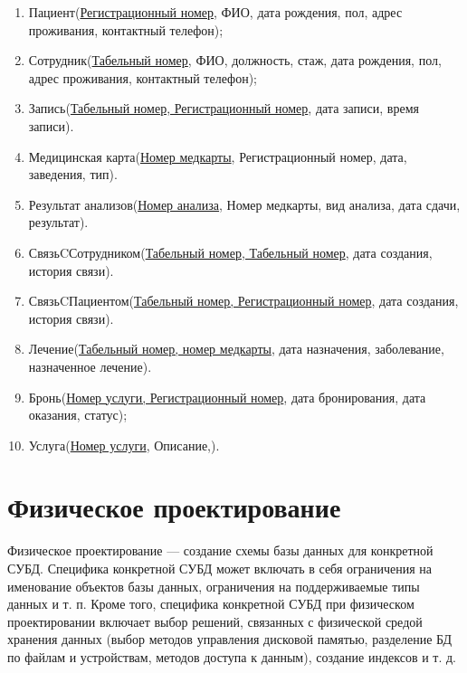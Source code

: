 \documentclass[14pt,a4paper,russian]{extreport}
\begin{document}
\begin{enumerate}
            \item Пациент(\underline{Регистрационный номер}, ФИО, дата рождения, пол, адрес
                проживания, контактный телефон);
            \item Сотрудник(\underline{Табельный номер}, ФИО, должность, стаж, дата рождения, пол, адрес
                проживания, контактный телефон);
            \item Запись(\underline{Табельный номер, Регистрационный номер}, дата записи, время
                записи).
            \item Медицинская карта(\underline{Номер медкарты}, Регистрационный номер, дата, 
                заведения, тип).
            \item Результат анализов(\underline{Номер анализа}, Номер медкарты, вид анализа, дата сдачи,
                результат).
            \item СвязьCСотрудником(\underline{Табельный номер, Табельный номер}, дата создания,
                история связи).
            \item СвязьCПациентом(\underline{Табельный номер, Регистрационный номер}, дата создания,
                история связи).
            \item Лечение(\underline{Табельный номер, номер медкарты}, дата назначения,
                заболевание, назначенное лечение).
            \item Бронь(\underline{Номер услуги, Регистрационный номер}, дата бронирования, дата
                оказания, статус);
            \item Услуга(\underline{Номер услуги}, Описание,).
\end{enumerate}



\chapter{Физическое проектирование}
Физическое проектирование — создание схемы базы данных для конкретной СУБД. Специфика конкретной
СУБД может включать в себя ограничения на именование объектов базы данных, ограничения на
поддерживаемые типы данных и т. п. Кроме того, специфика конкретной СУБД при физическом
проектировании включает выбор решений, связанных с физической средой хранения данных (выбор методов
управления дисковой памятью, разделение БД по файлам и устройствам, методов доступа к данным),
создание индексов и т. д.\cite{dbdesign} 
\end{document}

